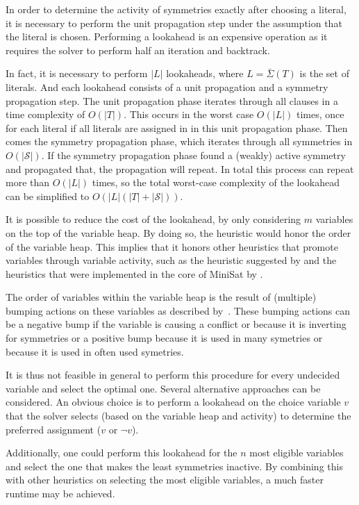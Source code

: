 	In order to determine the activity of symmetries exactly after choosing a literal,
	it is necessary to perform the unit propagation step under the assumption that the literal is chosen.
	Performing a lookahead is an expensive operation as it requires the solver to perform half an
	iteration and backtrack.

	In fact, it is necessary to perform $|L|$ lookaheads, where $L = \bar{\Sigma}(T)$ is the set of literals.
	And each lookahead consists of a unit propagation and a symmetry propagation step.
	The unit propagation phase iterates through all clauses in a time complexity of $O(|T|)$.
	This occurs in the worst case $O(|L|)$ times,
	once for each literal if all literals are assigned in in this unit propagation phase.
	Then comes the symmetry propagation phase, which iterates through all symmetries in $O(|\mathcal{S}|)$.
	If the symmetry propagation phase found a (weakly) active symmetry and propagated that,
	the propagation will repeat.
	In total this process can repeat more than $O(|L|)$ times,
	so the total worst-case complexity of the lookahead can be simplified to $O(|L|(|T| + |\mathcal{S}|))$.

	It is possible to reduce the cost of the lookahead, by only considering $m$ variables on
	the top of the variable heap.
	By doing so, the heuristic would honor the order of the variable heap.
	This implies that it honors other heuristics that promote variables through variable activity,
	such as the heuristic suggested by \cite{devriendt2012symmetry} and the heuristics that were
	implemented in the core of MiniSat by \cite{een2004extensible}.
	
	The order of variables within the variable heap is the result of (multiple) bumping actions on these variables
	as described by~\cite{devriendt2012symmetry}.
	These bumping actions can be a negative bump if the variable is causing a conflict or because it is inverting 
	for symmetries or a positive bump because it is used in many symetries or because it is used in often used 
	symetries.

	It is thus not feasible in general to perform this procedure for every undecided variable and
	select the optimal one.
	Several alternative approaches can be considered.
	An obvious choice is to perform a lookahead on the choice variable $v$ that the solver
	selects (based on the variable heap and activity) to determine the
	preferred assignment ($v$ or $\neg v$).

	Additionally, one could perform this lookahead for the $n$ most eligible variables
	and select the one that makes the least symmetries inactive.
	By combining this with other heuristics on selecting the most eligible variables,
	a much faster runtime may be achieved.

